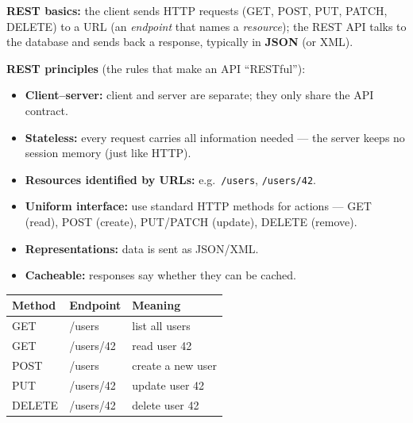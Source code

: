 \textbf{REST basics:} the client sends HTTP requests (GET, POST, PUT, PATCH, DELETE) to a URL (an \emph{endpoint} that names a \emph{resource}); the REST API talks to the database and sends back a response, typically in \textbf{JSON} (or XML).

\begin{center}
\end{center}

\textbf{REST principles} (the rules that make an API ``RESTful''):
\begin{itemize}
  \item \textbf{Client--server:} client and server are separate; they only share the API contract.
  \item \textbf{Stateless:} every request carries all information needed --- the server keeps no session memory (just like HTTP).
  \item \textbf{Resources identified by URLs:} e.g.\ \texttt{/users}, \texttt{/users/42}.
  \item \textbf{Uniform interface:} use standard HTTP methods for actions --- GET (read), POST (create), PUT/PATCH (update), DELETE (remove).
  \item \textbf{Representations:} data is sent as JSON/XML.
  \item \textbf{Cacheable:} responses say whether they can be cached.
\end{itemize}

\begin{center}
\begin{tabular}{>{\ttfamily}l >{\ttfamily}l l}
\toprule
\textrm{Method} & \textrm{Endpoint} & Meaning \\
\midrule
GET & /users & list all users \\
GET & /users/42 & read user 42 \\
POST & /users & create a new user \\
PUT & /users/42 & update user 42 \\
DELETE & /users/42 & delete user 42 \\
\bottomrule
\end{tabular}
\end{center}


